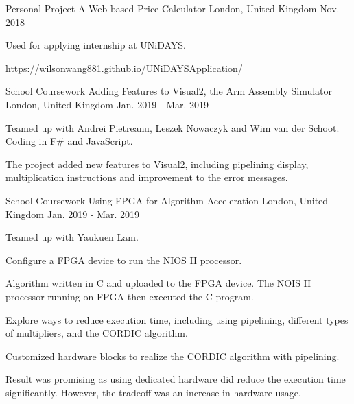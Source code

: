 \begin{cventries}
    \cventry
    {Personal Project} %
    {A Web-based Price Calculator} %
    {London, United Kingdom} %
    {Nov. 2018} %
    {
      \begin{cvitems} %
        \item {Used for applying internship at UNiDAYS.}
        \item {https://wilsonwang881.github.io/UNiDAYSApplication/}
      \end{cvitems}
    }
    
    \cventry
    {School Coursework} %
    {Adding Features to Visual2, the Arm Assembly Simulator} %
    {London, United Kingdom} %
    {Jan. 2019 - Mar. 2019} %
    {
      \begin{cvitems} %
        \item {Teamed up with Andrei Pietreanu, Leszek Nowaczyk and Wim van der Schoot. Coding in F\# and JavaScript.}
        \item {The project added new features to Visual2, including pipelining display, multiplication instructions and improvement to the error messages.}
      \end{cvitems}
    }
    
    \cventry
    {School Coursework} %
    {Using FPGA for Algorithm Acceleration} %
    {London, United Kingdom} %
    {Jan. 2019 - Mar. 2019} %
    {
      \begin{cvitems} %
        \item {Teamed up with Yaukuen Lam.}
        \item {Configure a FPGA device to run the NIOS II processor.}
        \item {Algorithm written in C and uploaded to the FPGA device. The NOIS II processor running on FPGA then executed the C program.}
        \item {Explore ways to reduce execution time, including using pipelining, different types of multipliers, and the CORDIC algorithm.}
        \item {Customized hardware blocks to realize the CORDIC algorithm with pipelining.}
        \item {Result was promising as using dedicated hardware did reduce the execution time significantly. However, the tradeoff was an increase in hardware usage.}
      \end{cvitems}
    }
    

\end{cventries}
